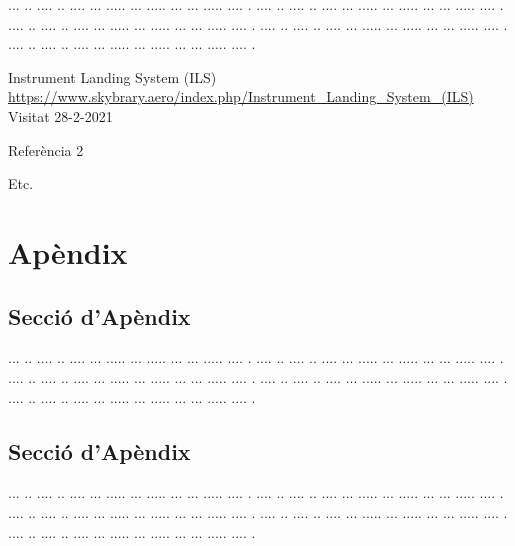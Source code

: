 ﻿\documentclass[10pt,a4paper,twocolumn,twoside]{article}
\begin{document}
... ..  .... .. .... ... ..... ... ..... ... ... ..... .... .
.... ..  .... .. .... ... ..... ... ..... ... ... ..... .... .
.... ..  .... .. .... ... ..... ... ..... ... ... ..... .... .
.... ..  .... .. .... ... ..... ... ..... ... ... ..... .... .
.... ..  .... .. .... ... ..... ... ..... ... ... ..... .... .

\begin{thebibliography}{9}
Instrument Landing System (ILS)
\\\url{https://www.skybrary.aero/index.php/Instrument_Landing_System_(ILS)}
\\Visitat 28-2-2021

Referència 2

Etc.


\end{thebibliography}

\appendix

\section*{Apèndix}

\setcounter{section}{1}

\subsection{Secció d'Apèndix}


... ..  .... .. .... ... ..... ... ..... ... ... ..... .... .
.... ..  .... .. .... ... ..... ... ..... ... ... ..... .... .
.... ..  .... .. .... ... ..... ... ..... ... ... ..... .... .
.... ..  .... .. .... ... ..... ... ..... ... ... ..... .... .
.... ..  .... .. .... ... ..... ... ..... ... ... ..... .... .

\subsection{Secció d'Apèndix}


... ..  .... .. .... ... ..... ... ..... ... ... ..... .... .
.... ..  .... .. .... ... ..... ... ..... ... ... ..... .... .
.... ..  .... .. .... ... ..... ... ..... ... ... ..... .... .
.... ..  .... .. .... ... ..... ... ..... ... ... ..... .... .
.... ..  .... .. .... ... ..... ... ..... ... ... ..... .... .
\end{document}
